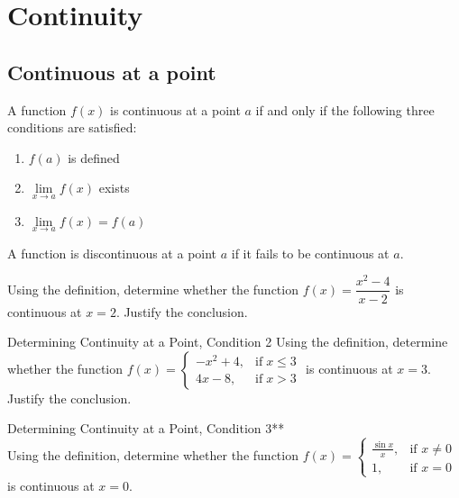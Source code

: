 
\hypertarget{continuity}{%
\section{Continuity}\label{continuity}}

\hypertarget{continuous-at-a-point}{%
\subsection{Continuous at a point}\label{continuous-at-a-point}}

\begin{definition}

A function \(f(x)\) is continuous at a point \(a\) if and only if the
following three conditions are satisfied:

\begin{enumerate}[sepno]
\item
  \(f(a)\) is defined
\item
  \(\lim\limits_{x\to a}f(x)\) exists
\item
  \(\lim\limits_{x\to a}f(x)=f(a)\)
\end{enumerate}

A function is discontinuous at a point \(a\) if it fails to be
continuous at \(a\).

\end{definition}

\begin{example}
Using the definition,
determine whether the function \(f(x)=\dfrac{x^2-4}{x-2}\) is continuous
at \(x=2\). Justify the conclusion.

\end{example}
\vspace*{6\baselineskip}

\begin{example}

Determining Continuity at a Point, Condition 2 Using the definition,
determine whether the function
\(f(x)=\begin{cases}-x^2+4, & \mathrm{if} \; x\le 3 \\ 4x-8, & \mathrm{if} \; x>3\end{cases}\)
is continuous at \(x=3\). Justify the conclusion.

\end{example}
\vspace*{6\baselineskip}

\begin{example}

Determining Continuity at a Point, Condition 3**\\
Using the definition, determine whether the function
\(f(x)=\begin{cases}\frac{\sin x}{x}, & \text{if } x\ne 0\\1, & \text{if } x=0\end{cases}\)
is continuous at \(x=0\).

\end{example}
\vspace*{6\baselineskip}

